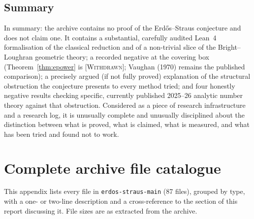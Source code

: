 \documentclass[11pt]{article}
\theoremstyle{plain}
\theoremstyle{definition}
\theoremstyle{remark}
\newcommand{\WITHDRAWN}{\textcolor{negative}{\textsc{[Withdrawn]}}}
\newcommand{\file}[1]{\texttt{#1}}
\renewcommand{\_}{\textunderscore\allowbreak}
\begin{document}
\subsection{Summary}

In summary: the archive contains no proof of the Erd\H{o}s--Straus conjecture and does not claim
one. It contains a substantial, carefully audited Lean~4 formalisation of the classical
reduction and of a non-trivial slice of the Bright--Loughran geometric theory; a recorded
negative at the covering box (Theorem~\ref{thm:epower} is \WITHDRAWN{}; Vaughan (1970) remains
the published comparison); a precisely
argued (if not fully proved) explanation of the structural obstruction the conjecture presents to
every method tried; and four honestly negative results checking specific, currently published
2025--26 analytic number theory against that obstruction. Considered as a piece of research
infrastructure and a research log, it is unusually complete and unusually disciplined about the
distinction between what is proved, what is claimed, what is measured, and what has been tried
and found not to work.


\appendix
\section{Complete archive file catalogue}
\label{app:files}

This appendix lists every file in \file{erdos-straus-main} (87 files), grouped by type, with a
one- or two-line description and a cross-reference to the section of this report discussing it.
File sizes are as extracted from the archive.
\end{document}
